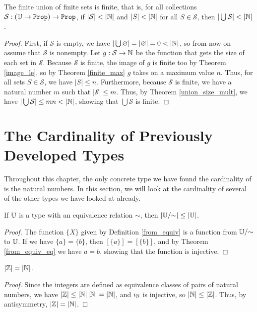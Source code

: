 \documentclass[../../math.tex]{subfiles}
\begin{document}
\begin{theorem} \label{finite_union_finite}
    The finite union of finite sets is finite, that is, for all collections
    $\mathcal S : (\U \to \Prop) \to \Prop$, if $|\mathcal S| < |\mathbb{N}|$ and $|S| <
    |\mathbb{N}|$ for all $S \in \mathcal S$, then $|\bigcup \mathcal S| < |\mathbb{N}|$.
\end{theorem}
\begin{proof}
    First, if $\mathcal S$ is empty, we have $|\bigcup \varnothing| =
    |\varnothing| = 0 < |\mathbb{N}|$, so from now on assume that $\mathcal S$ is
    nonempty.  Let $g : \mathcal S \to \mathbb{N}$ be the function that gets the size of
    each set in $\mathcal S$.  Because $\mathcal S$ is finite, the image of $g$
    is finite too by Theorem \ref{image_le}, so by Theorem \ref{finite_max} $g$
    takes on a maximum value $n$.  Thus, for all sets $S \in \mathcal S$, we
    have $|S| \leq n$.  Furthermore, because $\mathcal S$ is finite, we have a
    natural number $m$ such that $|\mathcal S| \leq m$.  Thus, by Theorem
    \ref{union_size_mult}, we have $|\bigcup \mathcal S| \leq mn < |\mathbb{N}|$,
    showing that $\bigcup \mathcal S$ is finite.
\end{proof}

\section{The Cardinality of Previously Developed Types}

Throughout this chapter, the only concrete type we have found the cardinality of
is the natural numbers.  In this section, we will look at the cardinality of
several of the other types we have looked at already.

\begin{theorem} \label{equiv_card_le}
    If $\mathbb{U}$ is a type with an equivalence relation $\sim$, then $|\mathbb{U}/{\sim}|
    \leq |\mathbb{U}|$.
\end{theorem}
\begin{proof}
    The function $\{X\}$ given by Definition \ref{from_equiv} is a function from
    $\mathbb{U}/{\sim}$ to $\mathbb{U}$.  If we have $\{a\} = \{b\}$, then $[\{a\}] = [\{b\}]$,
    and by Theorem \ref{from_equiv_eq} we have $a = b$, showing that the
    function is injective.
\end{proof}

\begin{theorem} \label{int_size}
    $|\mathbb{Z}| = |\mathbb{N}|$.
\end{theorem}
\begin{proof}
    Since the integers are defined as equivalence classes of pairs of natural
    numbers, we have $|\mathbb{Z}| \leq |\mathbb{N}| \, |\mathbb{N}| = |\mathbb{N}|$, and $\iota_{\mathbb{N}}$ is injective, so
    $|\mathbb{N}| \leq |\mathbb{Z}|$.  Thus, by antisymmetry, $|\mathbb{Z}| = |\mathbb{N}|$.
\end{proof}
\end{document}

